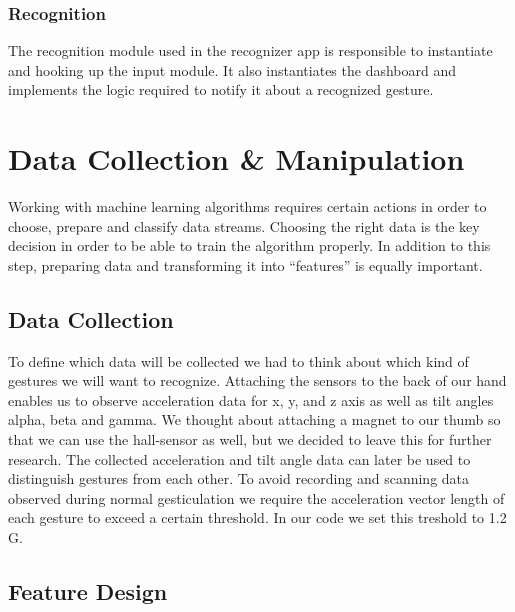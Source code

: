 \subsection{Recognition}
\label{ch:SystemDesign:sec:Components:sub:Recognition}

The recognition module used in the recognizer app is responsible to instantiate and hooking up the input module. It also instantiates the dashboard and implements the logic required to notify it about a recognized gesture.



\chapter{Data Collection \& Manipulation}
\label{ch:DataCollection}

Working  with  machine  learning  algorithms  requires  certain  actions  in  order  to choose, prepare and classify data streams.
Choosing the right data is the key decision in order to be able to train the  algorithm properly.
In addition to this  step, preparing data and transforming it into “features” is equally important. 

\section{Data Collection}
\label{ch:DataCollection:sec:DataCollection}

To  define  which  data  will  be  collected  we  had  to  think  about  which  kind  of gestures  we  will  want  to  recognize.
Attaching  the  sensors  to  the  back  of  our  hand enables us to observe acceleration data  for x,  y, and z axis  as well  as tilt  angles  alpha, beta and gamma.
We thought about attaching a magnet to our thumb so that we can use the hall-sensor as well,  but we decided to leave this  for  further research.
The collected acceleration and tilt angle data can later be used to distinguish gestures from each other.
To avoid recording and scanning data observed during normal gesticulation we require the acceleration vector length of each gesture to exceed a certain threshold.
In our code we set this treshold to 1.2 G.

\section{Feature Design}
\label{ch:DataCollection:sec:FeatureDesign}

